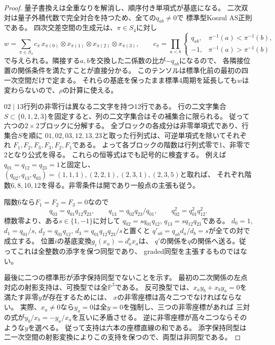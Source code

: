 \begin{proof}
量子書換えは全重なりを解消し、順序付き単項式が基底になる。
二次双対は量子外積代数で完全対合を持つため、全ての$q_{ab}\ne0$で
標準型Koszul AS正則である。
四次交差空間の生成元は、$\pi\in S_4$に対し
\[
 w=\sum_{\pi\in S_4}c_\pi\,
 x_{\pi(0)}\otimes x_{\pi(1)}\otimes x_{\pi(2)}\otimes x_{\pi(3)},\qquad
 c_\pi=\prod_{a<b}
 \begin{cases}q_{ab},&\pi^{-1}(a)<\pi^{-1}(b),\\-1,&\pi^{-1}(a)>\pi^{-1}(b)\end{cases}
\]
で与えられる。隣接する$a,b$を交換した二係数の比が$-q_{ab}$になるので、
各隣接位置の関係条件を満たすことが直接分かる。
このテンソルは標準化前の最初の四一次空間だけで定まる。
それらの基底を保ったまま標準4周期を延長しても$w$は変わらないので、$\rho$の計算に使える。

$02\mid13$行列の非零行は異なる二文字を持つ12行である。
行の二文字集合$S\subset\{0,1,2,3\}$を固定すると、列の二文字集合はその補集合に限られる。
従って六つの$2\times2$ブロックに分解する。
全ブロックの各成分は非零単項式であり、行集合$S$を順に
$01,02,03,12,13,23$と取った行列式は、可逆単項式を除いてそれぞれ
$F_1,F_2,F_3,F_3,F_2,F_1$である。
よって各ブロックの階数は行列式零で1、非零で2となり公式を得る。
これらの恒等式はでも記号的に検査する。
例えば$q_{01}=q_{12}=q_{23}=1$と固定し、
$(q_{02},q_{13},q_{03})=(1,1,1),(2,2,1),(2,3,1),(2,3,5)$と取れば、
それぞれ階数$6,8,10,12$を得る。非零条件は開であり一般点の主張も従う。

階数6なら$F_1=F_2=F_3=0$なので
\[
 q_{03}=q_{01}q_{12}q_{23},\qquad
 q_{13}=q_{02}q_{23}/q_{01},\qquad
 q_{02}^2=q_{01}^2q_{12}^2.
\]
標数零より、ある$s\in\{1,-1\}$に対して
$q_{02}=s q_{01}q_{12}$, $q_{13}=s q_{12}q_{23}$である。
$d_0=1$, $d_1=q_{01}/s$, $d_2=q_{01}q_{12}$,
$d_3=q_{01}q_{12}q_{23}/s$と置くと
$q'_{ab}=q_{ab}d_a/d_b=s$が全ての対で成立する。
位置$i$の基底変換$g_i(x_a)=d_a^i x_a$は、
$q'$の関係を$q$の関係へ送る。従ってこれは全整数の添字を保つ同型であり、
graded同型を主張するものではない。

最後に二つの標準形が添字保持同型でないことを示す。
最初の二次関係の左点対応の射影支持は、可換型では全$\mathbb P^3$である。
反可換型では、$x_ay_b+x_by_a=0$を満たす非零$y$が存在するためには、
$x$の非零座標は高々二つでなければならない。
実際、$x_a\ne0$なら$y_a=0$は全$y=0$を強制し、三つの非零座標があれば
三対の式が$y_b/x_b=-y_a/x_a$を互いに矛盾させる。
逆に非零座標が高々二つならそのような$y$を選べる。
従って支持は六本の座標直線の和である。
添字保持同型は二一次空間の射影変換によりこの支持を保つので、両型は非同型である。
\end{proof}

